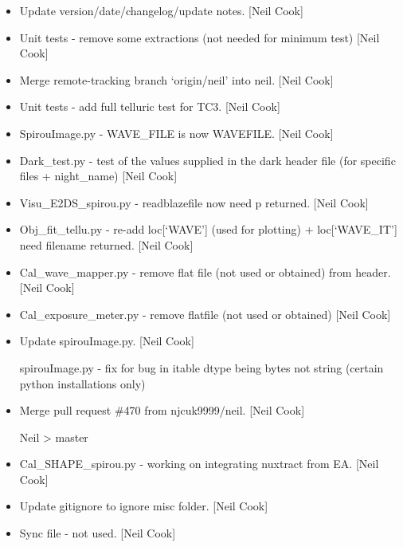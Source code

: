\documentclass[a4paper,10pt,english]{report}
\begin{document}
\begin{itemize}
\item {} 
Update version/date/changelog/update notes. {[}Neil Cook{]}

\item {} 
Unit tests - remove some extractions (not needed for minimum test)
{[}Neil Cook{]}

\item {} 
Merge remote-tracking branch ‘origin/neil’ into neil. {[}Neil Cook{]}

\item {} 
Unit tests - add full telluric test for TC3. {[}Neil Cook{]}

\item {} 
SpirouImage.py - WAVE\_FILE is now WAVEFILE. {[}Neil Cook{]}

\item {} 
Dark\_test.py - test of the values supplied in the dark header file
(for specific files + night\_name) {[}Neil Cook{]}

\item {} 
Visu\_E2DS\_spirou.py - readblazefile now need p returned. {[}Neil Cook{]}

\item {} 
Obj\_fit\_tellu.py - re-add loc{[}‘WAVE’{]} (used for plotting) +
loc{[}‘WAVE\_IT’{]} need filename returned. {[}Neil Cook{]}

\item {} 
Cal\_wave\_mapper.py - remove flat file (not used or obtained) from
header. {[}Neil Cook{]}

\item {} 
Cal\_exposure\_meter.py - remove flatfile (not used or obtained) {[}Neil
Cook{]}

\item {} 
Update spirouImage.py. {[}Neil Cook{]}

spirouImage.py - fix for bug in itable dtype being bytes not string (certain python installations only)

\item {} 
Merge pull request \#470 from njcuk9999/neil. {[}Neil Cook{]}

Neil \textendash{}\textgreater{} master

\item {} 
Cal\_SHAPE\_spirou.py - working on integrating nuxtract from EA. {[}Neil
Cook{]}

\item {} 
Update gitignore to ignore misc folder. {[}Neil Cook{]}

\item {} 
Sync file - not used. {[}Neil Cook{]}


\end{itemize}
\end{document}
